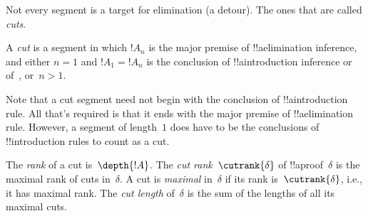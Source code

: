 \documentclass[../../../include/open-logic-section]{subfiles}
\begin{document}
Not every segment is a target for elimination (a detour). The ones that
are called \emph{cuts}.

\begin{defn}
A \emph{cut} is a segment in which $!A_n$ is the major premise of
!!a{elimination} inference, and either $n=1$ and $!A_1 = !A_n$ is the
conclusion of !!a{introduction} inference or of~\FalseInt, or~$n>1$.
\end{defn}

Note that a cut segment need not begin with the conclusion of
!!a{introduction} rule. All that's required is that it ends with the
major premise of !!a{elimination} rule. However, a segment of
length~$1$ does have to be the conclusions of !!{introduction} rules
to count as a cut.

\begin{defn}
The \emph{rank} of a cut is~$\depth{!A}$. The \emph{cut
rank}~$\cutrank{\delta}$ of !!a{proof}~$\delta$ is the maximal rank of
cuts in~$\delta$. A cut is \emph{maximal} in~$\delta$ if its rank
is~$\cutrank{\delta}$, i.e., it has maximal rank. The \emph{cut length}
of~$\delta$ is the sum of the lengths of all its maximal cuts.
\end{defn}
\end{document}

